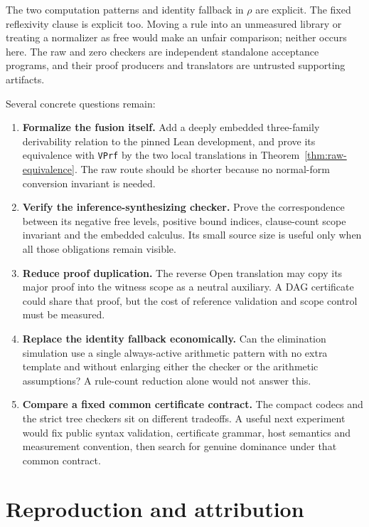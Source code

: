 \documentclass[11pt,letterpaper]{article}
\theoremstyle{definition}\newtheorem{definition}[theorem]{Definition}
\theoremstyle{remark}\newtheorem{remark}[theorem]{Remark}
\begin{document}
The two computation patterns and identity fallback in $\rho$ are explicit.
The fixed reflexivity clause is explicit too. Moving a rule into an
unmeasured library or treating a normalizer as free would make an unfair
comparison; neither occurs here. The raw and zero checkers are independent
standalone acceptance programs, and their proof producers and translators
are untrusted supporting artifacts.

Several concrete questions remain:
\begin{enumerate}
\item \textbf{Formalize the fusion itself.} Add a deeply embedded
      three-family derivability relation to the pinned Lean development,
      and prove its equivalence with \texttt{VPrf} by the two local
      translations in Theorem~\ref{thm:raw-equivalence}. The raw route
      should be shorter because no normal-form conversion invariant is
      needed.
\item \textbf{Verify the inference-synthesizing checker.} Prove the
      correspondence between its negative free levels, positive bound
      indices, clause-count scope invariant and the embedded calculus.
      Its small source size is useful only when all those obligations
      remain visible.
\item \textbf{Reduce proof duplication.} The reverse Open translation
      may copy its major proof into the witness scope as a neutral
      auxiliary. A DAG certificate could share that proof, but the cost
      of reference validation and scope control must be measured.
\item \textbf{Replace the identity fallback economically.} Can the
      elimination simulation use a single always-active arithmetic pattern
      with no extra template and without enlarging either the checker or
      the arithmetic assumptions? A rule-count reduction alone would not
      answer this.
\item \textbf{Compare a fixed common certificate contract.} The compact
      codecs and the strict tree checkers sit on different tradeoffs.
      A useful next experiment would fix public syntax validation,
      certificate grammar, host semantics and measurement convention,
      then search for genuine dominance under that common contract.
\end{enumerate}

\section{Reproduction and attribution}
\end{document}
